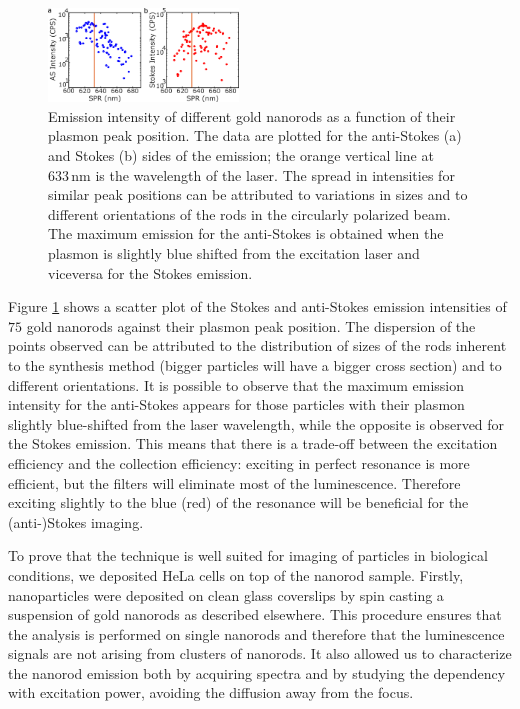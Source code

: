 \documentclass[journal=nalefd,manuscript=letter]{achemso}
\newcommand{\nm}{\ensuremath{\,\textrm{nm}}}
\begin{document}
\begin{figure}[htp] \centering
\includegraphics[width=0.45\textwidth]{Figures/03_Intensity_SPR/Intensity_SPR.png}
\caption{Emission intensity of different gold nanorods as a function of their
plasmon peak position. The data are plotted for the anti-Stokes (a) and Stokes
(b) sides of the emission; the orange vertical line at $633\nm$ is the
wavelength of the laser. The spread in intensities for similar peak positions
can be attributed to variations in sizes and to different orientations of the
rods in the circularly polarized beam. The maximum emission for the anti-Stokes
is obtained when the plasmon is slightly blue shifted from the excitation laser
and viceversa for the Stokes emission.}
	\label{fig:emission_peak_position}
\end{figure} 

Figure \ref{fig:emission_peak_position} shows a scatter plot of the Stokes and
anti-Stokes emission intensities of $75$ gold nanorods against their plasmon
peak position. The dispersion of the points observed can be attributed to the
distribution of sizes of the rods inherent to the synthesis
method\cite{Zijlstra2011} (bigger particles will have a bigger cross section)
and to different orientations. It is possible to observe that the maximum
emission intensity for the anti-Stokes appears for those particles with their
plasmon slightly blue-shifted from the laser wavelength, while the opposite is
observed for the Stokes emission. This means that there is a trade-off between
the excitation efficiency and the collection efficiency: exciting in perfect
resonance is more efficient, but the filters will eliminate most of the
luminescence. Therefore exciting slightly to the blue (red) of the resonance
will be beneficial for the (anti-)Stokes imaging.

To prove that the technique is well suited for imaging of particles in
biological conditions, we deposited HeLa cells on top of the nanorod sample.
Firstly, nanoparticles were deposited on clean glass coverslips by spin casting
a suspension of gold nanorods as described elsewhere\cite{Zijlstra2011}. This
procedure ensures that the analysis is performed on single nanorods and
therefore that the luminescence signals are not arising from clusters of
nanorods. It also allowed us to characterize the nanorod emission both by
acquiring spectra and by studying the dependency with excitation power, avoiding
the diffusion away from the focus.
\end{document}
